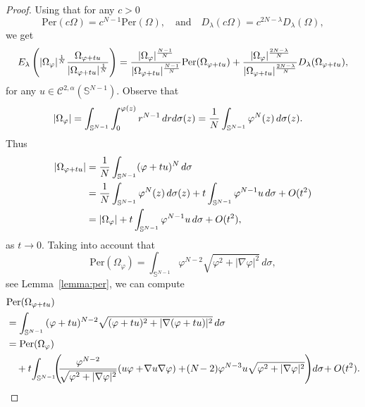 \documentclass[10pt,reqno,english]{amsart}
\newcommand{\Sn}{\mathbb{S}^{N-1}}
\theoremstyle{definition}
\numberwithin{equation}{section}
\begin{document}
\begin{proof}

Using that for any $c>0$
\[
{\mbox {Per}} (c \Omega) = c^{N-1 }
{\mbox {Per}} ( \Omega), \quad \text{and}\quad D_\lambda(c\Omega)=c^{2N-\lambda}D_\lambda(\Omega),
\]
we get
\[
E_\lambda \left( |\Omega_\varphi |^{1\over N}  {\Omega_{\varphi +t u} \over |\Omega_{\varphi+tu}|^{1\over N}} \right) =
          { |\Omega_\varphi |^{N-1 \over N} \over |\Omega_{\varphi+tu}|^{N-1\over N}} {\mbox {Per}} (\Omega_{\varphi + t u})+ { |\Omega_\varphi |^{2N-\lambda \over N} \over |\Omega_{\varphi+tu}|^{2N-\lambda\over N}}D_\lambda(\Omega_{\varphi + t u}),
  \]
  for any $u\in\mathcal C^{2,\alpha}(\Sn)$.
    Observe that
    \begin{align*}
        |\Omega_{\varphi} | &= \int_{\mathbb S^{N-1}} \int_0^{\varphi (z)} r^{N-1}\, dr d\sigma(z) = {1\over N} \int_{\mathbb S^{N-1} }
        \varphi^N (z)\, d\sigma(z).
    \end{align*}
    Thus
  \begin{align*}
        |\Omega_{\varphi +tu} | &=   {1\over N} \int_{\mathbb S^{N-1} }
        (\varphi  + t u  )^N \,  d \sigma \\
        &=   {1\over N} \int_{\mathbb S^{N-1} }
        \varphi^N (z)\,  d \sigma(z) + t \int_{\mathbb S^{N-1}} \varphi^{N-1}  u  \,  d \sigma + O (t^2)\\
         &=   |\Omega_{\varphi } | + t \int_{\mathbb S^{N-1}} \varphi^{N-1}  u \,  d \sigma + O (t^2),
    \end{align*}    
    as $t \to 0$.
Taking into account that
\begin{equation}
\label{formula-perimetro}
     {\mbox {Per}} (\Omega_{\varphi })=\int_{\mathbb S^{N-1}} \varphi^{N-2} \sqrt{\varphi^2 + |\nabla \varphi |^2} \, d\sigma,
\end{equation}
see Lemma~\ref{lemma:per}, we can compute
\begin{align*}
    &{\mbox {Per}} (\Omega_{\varphi +tu})\\
    &= \int_{\mathbb S^{N-1} }\, (\varphi + t u )^{N-2} \sqrt{ (\varphi + t u )^2 + |\nabla (\varphi + t u)|^2}  \, d \sigma\\
    &={\mbox {Per}} (\Omega_{\varphi})\\
     &\quad+ t \! \int_{\mathbb S^{N-1}\!\!\!} \left(\! \!{\varphi^{N-2} \over  \sqrt{ \varphi^2 + |\nabla \varphi|^2}} (u \varphi +\! \nabla u \nabla \varphi) +\! (N\!-2) \varphi^{N-3} u  \sqrt{ \varphi^2 + |\nabla \varphi|^2}\right) \!d \sigma\! + O(t^2).
\end{align*}

\end{proof}
\end{document}
